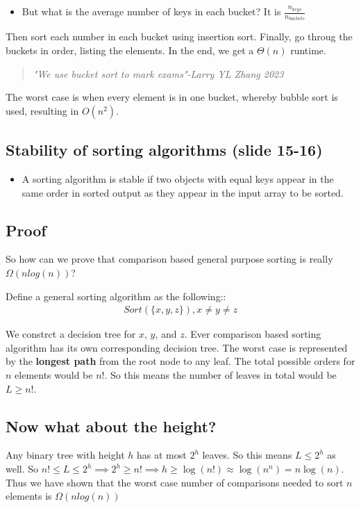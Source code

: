 \documentclass[12pt]{article}
\begin{document}
\begin{itemize}
    \item But what is the average number of keys in each bucket? It is $\frac{n_{keys}}{n_{buckets}}$
\end{itemize}

Then sort each number in each bucket using insertion sort. Finally, go throug the buckets in order, listing the elements. In the end, we get a $\Theta(n)$ runtime.

\begin{quote}
    \textit{"We use bucket sort to mark exams"-Larry YL Zhang 2023}
\end{quote}

The worst case is when every element is in one bucket, whereby bubble sort is used, resulting in $O(n^2)$.

\subsection*{Stability of sorting algorithms (slide 15-16)}

\begin{itemize}
    \item A sorting algorithm is stable if two objects with equal keys appear in the same order in sorted output as they appear in the input array to be sorted.
\end{itemize}

\subsection*{Proof}
So how can we prove that comparison based general purpose sorting is really $\Omega(nlog(n))$?

Define a general sorting algorithm as the following::
\begin{align*}
    Sort(\{x,y,z\}), x\neq y\neq z
\end{align*}

We constrct a decision tree for $x$, $y$, and $z$. Ever comparison based sorting algorithm has its own corresponding decision tree. The worst case is represented by the \textbf{longest path} from the root node to any leaf. The total possible orders for $n$ elements would be $n!$. So this means the number of leaves in total would be $L\geq n!$.

\subsection*{Now what about the height?}
Any binary tree with height $h$ has at most $2^h$ leaves. So this means $L\leq 2^h$ as well. So $n!\leq L \leq 2^h\implies 2^h\geq n!\implies h\geq \log(n!)\approx \log(n^n)=n\log(n)$. Thus we have shown that the worst case number of comparisons needed to sort $n$ elements is $\Omega(nlog(n))$
\end{document}
